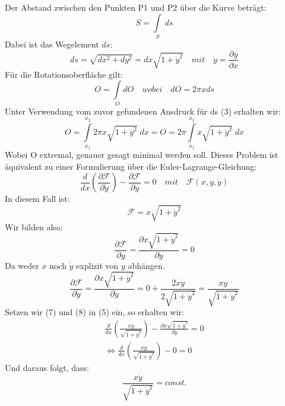 \documentclass[a4paper,german,12pt,smallheadings]{scrartcl}
\begin{document}
Der Abstand zwischen den Punkten P1 und P2 über die Kurve beträgt:
\begin{equation}
S=\int\limits_S\ ds
\end{equation}
Dabei ist das Wegelement $ds$:
\begin{equation}
ds=\sqrt{dx^2+dy^2}=dx\sqrt{1+\dot{y}^2} \quad mit \quad \dot{y}=\frac{\partial y}{\partial x}
\end{equation}
Für die Rotationsoberfläche gilt:
\begin{equation}
O=\int\limits_O dO \quad wobei \quad dO=2\pi x ds
\end{equation}
Unter Verwendung vom zuvor gefundenen Ausdruck für ds (3) erhalten wir:
\begin{equation}
O=\int\limits_{x_1}^{x_2} 2\pi x \sqrt{1+\dot{y}^2} \; dx = O=2\pi \int\limits_{x_1}^{x_2} x \sqrt{1+\dot{y}^2} \; dx
\end{equation}
Wobei O extremal, genauer gesagt minimal werden soll. Dieses Problem ist äquivalent zu einer Formulierung über die Euler-Lagrange-Gleichung:
\begin{equation}
\frac{d}{dx}\left(\frac{\partial \mathcal{F}}{\partial \dot{y}}\right)-\frac{\partial \mathcal{F}}{\partial y}=0 \quad mit \quad \mathcal{F}(x,y,\dot{y})
\end{equation}
In diesem Fall ist:
\begin{equation}
\mathcal{F}=x \sqrt{1+\dot{y}^2}
\end{equation}
Wir bilden also:
\begin{equation}
\frac{\partial \mathcal{F}}{\partial y}=\frac{\partial x \sqrt{1+\dot{y}^2}}{\partial y}=0
\end{equation}
Da weder $x$ noch $\dot{y}$ explizit von $y$ abhängen.
\begin{equation}
\frac{\partial \mathcal{F}}{\partial \dot{y}}=\frac{\partial x \sqrt{1+ \dot{y}^2}}{\partial \dot{y}}=0 + \frac{2x \dot{y}}{2 \sqrt{1+ \dot{y}^2}}=\frac{x \dot{y}}{\sqrt{1+ \dot{y}^2}}
\end{equation}
Setzen wir (7) und (8) in (5) ein, so erhalten wir:
\begin{align*}
\frac{d}{dx}\left(\frac{x \dot{y}}{\sqrt{1+ \dot{y}^2}}\right)-\frac{\partial x \sqrt{1+\dot{y}^2}}{\partial y}=0\\
\Leftrightarrow \frac{d}{dx}\left(\frac{x \dot{y}}{\sqrt{1+ \dot{y}^2}}\right)-0=0
\end{align*}
Und daraus folgt, dass:
\begin{equation}
\frac{x \dot{y}}{\sqrt{1+ \dot{y}^2}}=const.
\end{equation}
\end{document}
